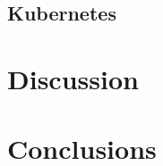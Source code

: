 \documentclass{article}
\begin{document}
\subsection{Kubernetes}
\lipsum[1]


\section{Discussion}
\lipsum[1]

\section{Conclusions}
\lipsum[1]


\vspace{-7.5mm}
\renewcommand{\refname}{\section{References}}

\end{document}
